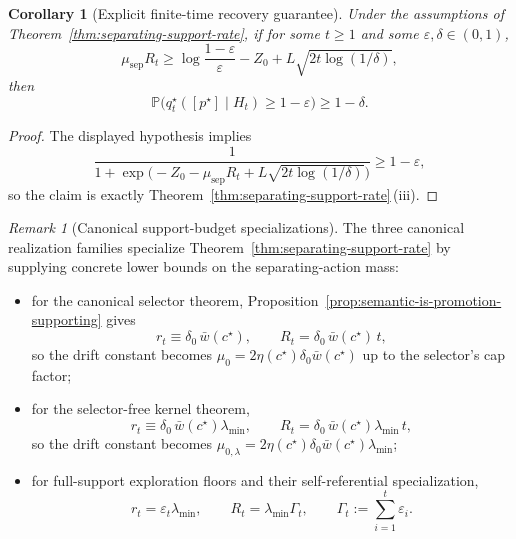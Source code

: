 \documentclass[11pt]{article}
\newtheorem{corollary}[theorem]{Corollary}
\theoremstyle{definition}
\theoremstyle{remark}
\newtheorem{remark}[theorem]{Remark}
\newcommand{\Prob}{\mathbb{P}}
\begin{document}
\begin{corollary}[Explicit finite-time recovery guarantee]
\label{cor:separating-support-finite-time}
Under the assumptions of Theorem~\ref{thm:separating-support-rate}, if for some $t\ge 1$ and some $\varepsilon,\delta\in(0,1)$,
\[
\mu_{\mathrm{sep}}R_t
\ge
\log\frac{1-\varepsilon}{\varepsilon}-Z_0+L\sqrt{2t\log(1/\delta)},
\]
then
\[
\Prob\!\bigl(q_t^\star([p^\star]\mid H_t)\ge 1-\varepsilon\bigr)\ge 1-\delta.
\]
\end{corollary}

\begin{proof}
The displayed hypothesis implies
\[
\frac{1}{1+\exp\!\bigl(-Z_0-\mu_{\mathrm{sep}}R_t+L\sqrt{2t\log(1/\delta)}\bigr)}\ge 1-\varepsilon,
\]
so the claim is exactly Theorem~\ref{thm:separating-support-rate}\,\textup{(iii)}.
\end{proof}

\begin{remark}[Canonical support-budget specializations]
\label{rem:canonical-support-budgets}
The three canonical realization families specialize Theorem~\ref{thm:separating-support-rate} by supplying concrete lower bounds on the separating-action mass:
\begin{itemize}
\item[(i)] for the canonical selector theorem, Proposition~\ref{prop:semantic-is-promotion-supporting} gives
\[
r_t\equiv \delta_0\,\bar w(c^\star),
\qquad
R_t=\delta_0\,\bar w(c^\star)\,t,
\]
so the drift constant becomes $\mu_0=2\eta(c^\star)\delta_0\bar w(c^\star)$ up to the selector's cap factor;
\item[(ii)] for the selector-free kernel theorem,
\[
r_t\equiv \delta_0\,\bar w(c^\star)\lambda_{\min},
\qquad
R_t=\delta_0\,\bar w(c^\star)\lambda_{\min}\,t,
\]
so the drift constant becomes $\mu_{0,\lambda}=2\eta(c^\star)\delta_0\bar w(c^\star)\lambda_{\min}$;
\item[(iii)] for full-support exploration floors and their self-referential specialization,
\[
r_t=\varepsilon_t\lambda_{\min},
\qquad
R_t=\lambda_{\min}\Gamma_t,
\qquad
\Gamma_t:=\sum_{i=1}^t\varepsilon_i.
\]
\end{itemize}
\end{remark}
\end{document}
